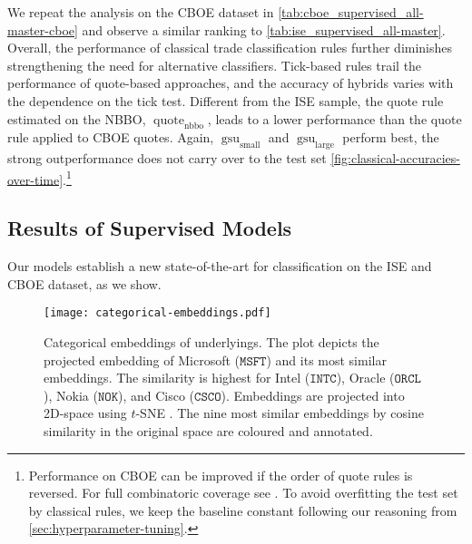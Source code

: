 We repeat the analysis on the \gls{CBOE} dataset in \cref{tab:cboe_supervised_all-master-cboe} and observe a similar ranking to \cref{tab:ise_supervised_all-master}. Overall, the performance of classical trade classification rules further diminishes strengthening the need for alternative classifiers. Tick-based rules trail the performance of quote-based approaches, and the accuracy of hybrids varies with the dependence on the tick test. Different from the \gls{ISE} sample, the quote rule estimated on the \gls{NBBO}, $\operatorname{quote}_{\mathrm{nbbo}}$, leads to a lower performance than the quote rule applied to \gls{CBOE} quotes. 
Again, $\operatorname{gsu}_{\mathrm{small}}$ and $\operatorname{gsu}_{\mathrm{large}}$ perform best, the strong outperformance does not carry over to the test set \cref{fig:classical-accuracies-over-time}.\footnote{Performance on \gls{CBOE} can be improved if the order of quote rules is reversed. For full combinatoric coverage see \textcite[][33]{grauerOptionTradeClassification2022}. To avoid overfitting the test set by classical rules, we keep the baseline constant following our reasoning from \cref{sec:hyperparameter-tuning}.}


\subsection{Results of Supervised
    Models}\label{sec:results-of-supervised-models}

Our models establish a new state-of-the-art for classification on the \gls{ISE} and \gls{CBOE} dataset, as we show.

\begin{figure}[ht]
    \centering
    \texttt{[image: categorical-embeddings.pdf]}
    \caption[Categorical Embeddings of Underlyings]{Categorical embeddings of underlyings. The plot depicts the projected embedding of Microsoft ($\mathtt{MSFT}$) and its most similar embeddings. The similarity is highest for Intel ($\mathtt{INTC}$), Oracle ($\mathtt{ORCL}$), Nokia ($\mathtt{NOK}$), and Cisco ($\mathtt{CSCO}$). Embeddings are projected into 2D-space using $t$-SNE \autocite{vandermaatenVisualizingDataUsing2008}. The nine most similar embeddings by cosine similarity in the original space are coloured and annotated.}
    \label{fig:categorical-embeddings}
\end{figure}

